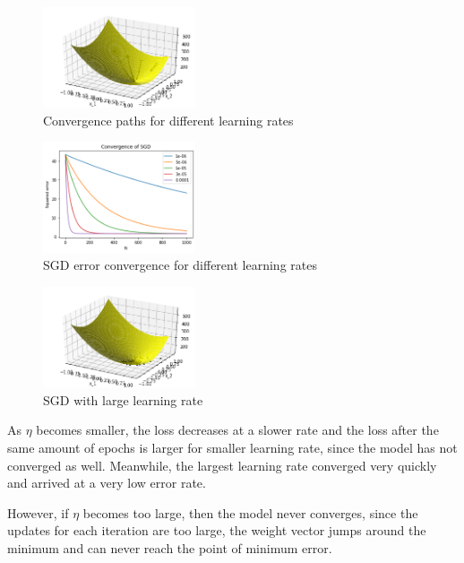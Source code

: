 \begin{solution}
  \begin{figure}[H]
    \centering
    \includegraphics[width=0.4\textwidth]{images/3e_1.png}
    \caption{Convergence paths for different learning rates}
    \label{fig:3e_1}
  \end{figure}

  \begin{figure}[H]
    \centering
    \includegraphics[width=0.4\textwidth]{images/3e_2.png}
    \caption{SGD error convergence for different learning rates}
    \label{fig:3e_2}
  \end{figure}

  \begin{figure}[H]
    \centering
    \includegraphics[width=0.4\textwidth]{images/3e_3.png}
    \caption{SGD with large learning rate}
    \label{fig:3e_3}
  \end{figure}

  As $\eta$ becomes smaller, the loss decreases at a slower rate and the loss after the same amount of epochs is larger for smaller learning rate, since the model has not converged as well. Meanwhile, the largest learning rate converged very quickly and arrived at a very low error rate.

  However, if $\eta$ becomes too large, then the model never converges, since the updates for each iteration are too large, the weight vector jumps around the minimum and can never reach the point of minimum error.
\end{solution}


